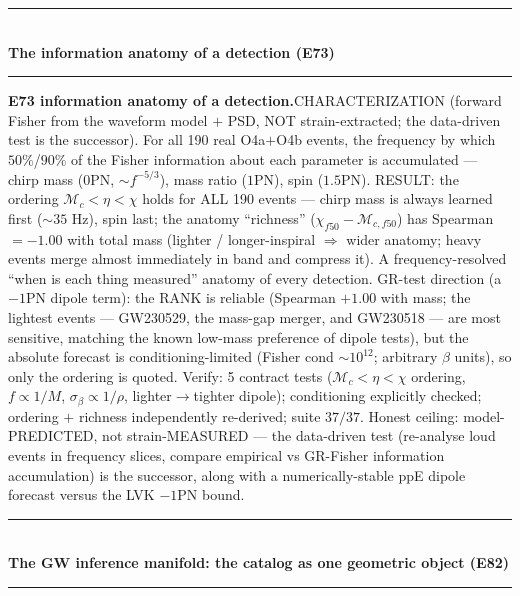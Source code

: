 \documentclass[10pt]{article}
\newcommand{\entry}[2]{\vspace{5pt}\noindent\textbf{#1}\quad #2\par}
\newcommand{\grouphead}[1]{\vspace{9pt}\noindent\rule{\linewidth}{0.4pt}\\[-2pt]{\small\textbf{#1}}\\[-4pt]\rule{\linewidth}{0.4pt}\par\vspace{2pt}}
\begin{document}
\grouphead{The information anatomy of a detection (E73)}

\entry{E73 information anatomy of a detection.}{CHARACTERIZATION (forward Fisher from the waveform model
$+$ PSD, NOT strain-extracted; the data-driven test is the successor). For all 190 real O4a$+$O4b events,
the frequency by which $50\%$/$90\%$ of the Fisher information about each parameter is accumulated ---
chirp mass ($0$PN, $\sim f^{-5/3}$), mass ratio ($1$PN), spin ($1.5$PN). RESULT: the ordering
$\mathcal{M}_c<\eta<\chi$ holds for ALL 190 events --- chirp mass is always learned first ($\sim35$ Hz),
spin last; the anatomy ``richness'' ($\chi_{f50}-\mathcal{M}_{c,f50}$) has Spearman $=-1.00$ with total mass
(lighter / longer-inspiral $\Rightarrow$ wider anatomy; heavy events merge almost immediately in band and
compress it). A frequency-resolved ``when is each thing measured'' anatomy of every detection. GR-test
direction (a $-1$PN dipole term): the RANK is reliable (Spearman $+1.00$ with mass; the lightest events ---
GW230529, the mass-gap merger, and GW230518 --- are most sensitive, matching the known low-mass preference
of dipole tests), but the absolute forecast is conditioning-limited (Fisher cond $\sim10^{12}$; arbitrary
$\beta$ units), so only the ordering is quoted. Verify: 5 contract tests ($\mathcal{M}_c<\eta<\chi$
ordering, $f\propto1/M$, $\sigma_\beta\propto1/\rho$, lighter$\to$tighter dipole); conditioning explicitly
checked; ordering $+$ richness independently re-derived; suite $37/37$. Honest ceiling: model-PREDICTED, not
strain-MEASURED --- the data-driven test (re-analyse loud events in frequency slices, compare empirical vs
GR-Fisher information accumulation) is the successor, along with a numerically-stable ppE dipole forecast
versus the LVK $-1$PN bound.}

\grouphead{The GW inference manifold: the catalog as one geometric object (E82)}
\end{document}
